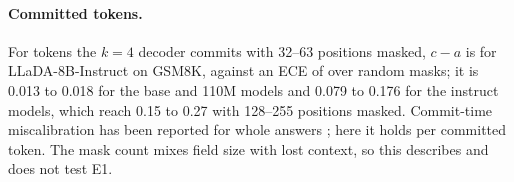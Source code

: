 \paragraph{Committed tokens.}
\label{sec:c1-app-native}
For tokens the $k{=}4$ decoder commits with 32--63 positions masked, $c-a$ is
 for LLaDA-8B-Instruct on GSM8K,
against an ECE of  over random masks; it is 0.013 to 0.018 for
the base and 110M models and 0.079 to 0.176 for the instruct models, which reach 0.15 to 0.27
with 128--255 positions masked. Commit-time miscalibration has been reported for whole answers
\citep{jiang2026bayeser}; here it holds per committed token. The mask count mixes field size
with lost context, so this describes and does not test E1.

\begin{table}[t]
  \centering
  \par\medskip
    {\Cfit{}}{}
  \caption{Controls. Top: E1 and E2 without a control and with position, token type, or
    a temperature per mask-rate bin (log-odds; it rescales confidence only, so its E2
    column is empty). In both parts E2 uses logistic calibrators for both
    $\hat\pi(\ell)$ and $\hat\pi(\ell,s)$, so that with and without differ only by the control;
    its ``without'' value differs from the isotonic E2 of Table~\ref{tab:c1-main}.
    $^\ddagger$the paired with-minus-without difference has a 95\% interval
    excluding 0. Bottom: LLaDA-8B-Base on the documents of the 4-bit run, fp16 against
    4-bit NF4, with the difference and its interval. Exploratory.}
  \label{tab:c1-t8}
\end{table}

